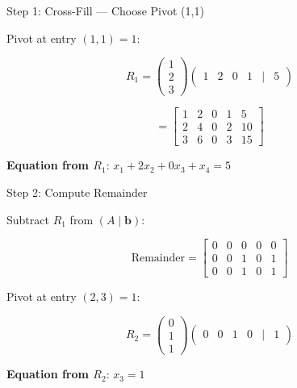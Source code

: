 \documentclass[10pt]{beamer}
\theoremstyle{definition}
\newcommand{\x}[1]{\alert{\textbf{#1}}}
\begin{document}
\begin{frame}{Step 1: Cross-Fill — Choose Pivot (1,1)}

Pivot at entry $(1,1) = 1$:

$$R_1 = \begin{pmatrix} 1 \\ 2 \\ 3 \end{pmatrix} \begin{pmatrix} 1 & 2 & 0 & 1 & | & 5 \end{pmatrix}$$

$$= \left[\begin{array}{cccc|c}
1 & 2 & 0 & 1 & 5 \\
2 & 4 & 0 & 2 & 10 \\
3 & 6 & 0 & 3 & 15
\end{array}\right]$$

\vspace{0.5em}

\x{Equation from $R_1$}: $x_1 + 2x_2 + 0x_3 + x_4 = 5$

\end{frame}

\begin{frame}{Step 2: Compute Remainder}

Subtract $R_1$ from $(A \mid \mathbf{b})$:

$$\text{Remainder} = \left[\begin{array}{cccc|c}
0 & 0 & 0 & 0 & 0 \\
0 & 0 & 1 & 0 & 1 \\
0 & 0 & 1 & 0 & 1
\end{array}\right]$$

\vspace{0.5em}

Pivot at entry $(2,3) = 1$:

$$R_2 = \begin{pmatrix} 0 \\ 1 \\ 1 \end{pmatrix} \begin{pmatrix} 0 & 0 & 1 & 0 & | & 1 \end{pmatrix}$$

\x{Equation from $R_2$}: $x_3 = 1$

\end{frame}
\end{document}
